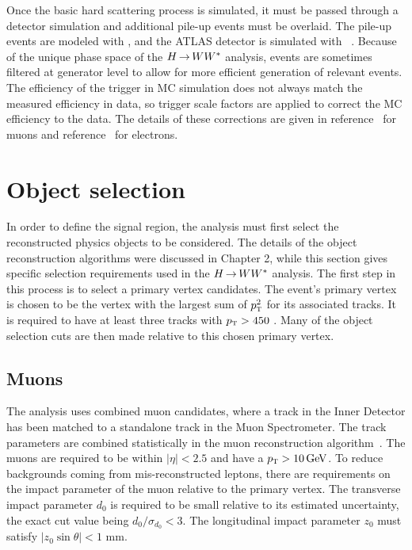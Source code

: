 Once the basic hard scattering process is simulated, it must be passed through a detector simulation and additional pile-up events must be overlaid. The pile-up events are modeled with , and the ATLAS detector is simulated with ~\cite{geant4}. Because of the unique phase space of the $H{\,{\rightarrow}\,}WW^\ast$ analysis, events are sometimes filtered at generator level to allow for more efficient generation of relevant events. The efficiency of the trigger in MC simulation does not always match the measured efficiency in data, so trigger scale factors are applied to correct the MC efficiency to the data. The details of these corrections are given in reference~\cite{MuonTrigger2012} for muons and reference~\cite{ElectronTrigger2012} for electrons.

\section{Object selection}

In order to define the signal region, the analysis must first select the reconstructed physics objects to be considered. The details of the object reconstruction algorithms were discussed in Chapter 2, while this section gives specific selection requirements used in the $H{\,{\rightarrow}\,}WW^\ast$ analysis. The first step in this process is to select a primary vertex candidates. The event's primary vertex is chosen to be the vertex with the largest sum of $p_{\textrm{\footnotesize\sc t}}^2$ for its associated tracks. It is required to have at least three tracks with $p_{\textrm{\footnotesize\sc t}} > 450$ \MeV. Many of the object selection cuts are then made relative to this chosen primary vertex.

\subsection{Muons}

The analysis uses combined muon candidates, where a track in the Inner Detector has been matched to a standalone track in the Muon Spectrometer. The track parameters are combined statistically in the muon reconstruction algorithm~\cite{MuonReco}. The muons are required to be within $|\eta| < 2.5$ and have a $\pT > 10 \GeV$. To reduce backgrounds coming from mis-reconstructed leptons, there are requirements on the impact parameter of the muon relative to the primary vertex. The transverse impact parameter $d_0$ is required to be small relative to its estimated uncertainty, the exact cut value being $d_0/\sigma_{d_0} < 3$. The longitudinal impact parameter $z_0$ must satisfy $\left|z_0\sin\theta\right| < 1$ mm. 

